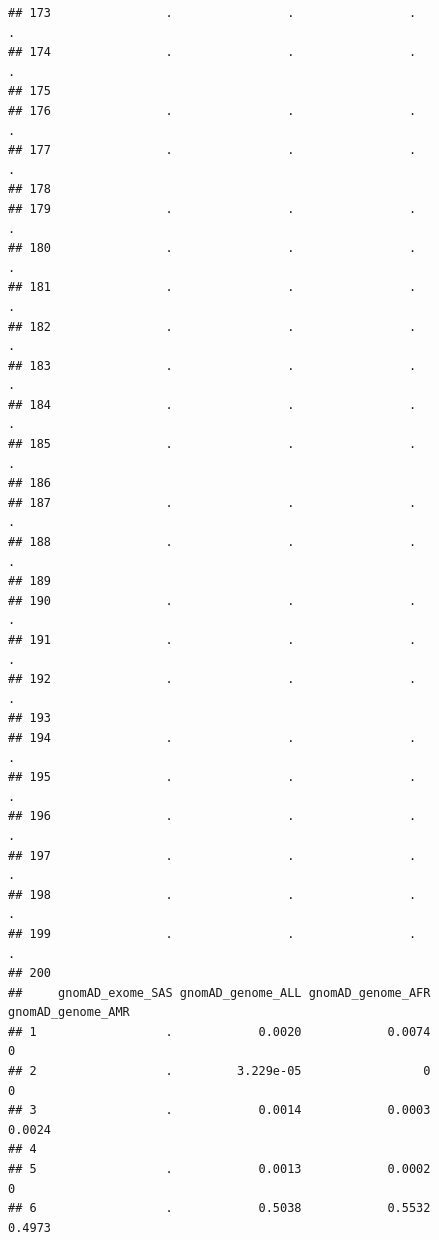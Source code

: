 \documentclass[
]{article}
\begin{document}
\begin{verbatim}
## 173                .                .                .                .
## 174                .                .                .                .
## 175                                                                    
## 176                .                .                .                .
## 177                .                .                .                .
## 178                                                                    
## 179                .                .                .                .
## 180                .                .                .                .
## 181                .                .                .                .
## 182                .                .                .                .
## 183                .                .                .                .
## 184                .                .                .                .
## 185                .                .                .                .
## 186                                                                    
## 187                .                .                .                .
## 188                .                .                .                .
## 189                                                                    
## 190                .                .                .                .
## 191                .                .                .                .
## 192                .                .                .                .
## 193                                                                    
## 194                .                .                .                .
## 195                .                .                .                .
## 196                .                .                .                .
## 197                .                .                .                .
## 198                .                .                .                .
## 199                .                .                .                .
## 200                                                                    
##     gnomAD_exome_SAS gnomAD_genome_ALL gnomAD_genome_AFR gnomAD_genome_AMR
## 1                  .            0.0020            0.0074                 0
## 2                  .         3.229e-05                 0                 0
## 3                  .            0.0014            0.0003            0.0024
## 4                                                                         
## 5                  .            0.0013            0.0002                 0
## 6                  .            0.5038            0.5532            0.4973

\end{verbatim}
\end{document}
